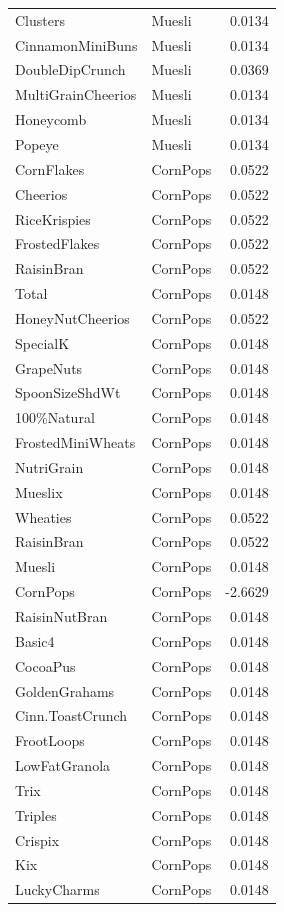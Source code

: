 \begin{longtable}{llr}
Clusters & Muesli & 0.0134 \\
CinnamonMiniBuns & Muesli & 0.0134 \\
DoubleDipCrunch & Muesli & 0.0369 \\
MultiGrainCheerios & Muesli & 0.0134 \\
Honeycomb & Muesli & 0.0134 \\
Popeye & Muesli & 0.0134 \\
CornFlakes & CornPops & 0.0522 \\
Cheerios & CornPops & 0.0522 \\
RiceKrispies & CornPops & 0.0522 \\
FrostedFlakes & CornPops & 0.0522 \\
RaisinBran & CornPops & 0.0522 \\
Total & CornPops & 0.0148 \\
HoneyNutCheerios & CornPops & 0.0522 \\
SpecialK & CornPops & 0.0148 \\
GrapeNuts & CornPops & 0.0148 \\
SpoonSizeShdWt & CornPops & 0.0148 \\
100\%Natural & CornPops & 0.0148 \\
FrostedMiniWheats & CornPops & 0.0148 \\
NutriGrain & CornPops & 0.0148 \\
Mueslix & CornPops & 0.0148 \\
Wheaties & CornPops & 0.0522 \\
RaisinBran & CornPops & 0.0522 \\
Muesli & CornPops & 0.0148 \\
CornPops & CornPops & -2.6629 \\
RaisinNutBran & CornPops & 0.0148 \\
Basic4 & CornPops & 0.0148 \\
CocoaPus & CornPops & 0.0148 \\
GoldenGrahams & CornPops & 0.0148 \\
Cinn.ToastCrunch & CornPops & 0.0148 \\
FrootLoops & CornPops & 0.0148 \\
LowFatGranola & CornPops & 0.0148 \\
Trix & CornPops & 0.0148 \\
Triples & CornPops & 0.0148 \\
Crispix & CornPops & 0.0148 \\
Kix & CornPops & 0.0148 \\
LuckyCharms & CornPops & 0.0148 \\

\end{longtable}
